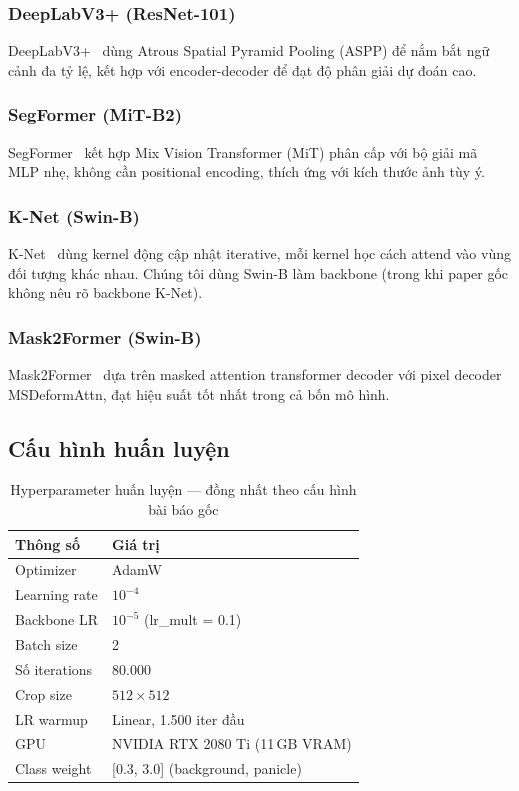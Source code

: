 \documentclass[12pt, a4paper]{article}
\begin{document}
\subsubsection{DeepLabV3+ (ResNet-101)}
DeepLabV3+~\cite{chen2018deeplabv3plus} dùng Atrous Spatial Pyramid Pooling (ASPP) để nắm bắt ngữ cảnh đa tỷ lệ, kết hợp với encoder-decoder để đạt độ phân giải dự đoán cao.

\subsubsection{SegFormer (MiT-B2)}
SegFormer~\cite{xie2021segformer} kết hợp Mix Vision Transformer (MiT) phân cấp với bộ giải mã MLP nhẹ, không cần positional encoding, thích ứng với kích thước ảnh tùy ý.

\subsubsection{K-Net (Swin-B)}
K-Net~\cite{zhang2021knet} dùng kernel động cập nhật iterative, mỗi kernel học cách attend vào vùng đối tượng khác nhau. Chúng tôi dùng Swin-B làm backbone (trong khi paper gốc không nêu rõ backbone K-Net).

\subsubsection{Mask2Former (Swin-B)}
Mask2Former~\cite{cheng2022mask2former} dựa trên masked attention transformer decoder với pixel decoder MSDeformAttn, đạt hiệu suất tốt nhất trong cả bốn mô hình.

\subsection{Cấu hình huấn luyện}

\begin{table}[H]
\centering
\caption{Hyperparameter huấn luyện --- đồng nhất theo cấu hình bài báo gốc}
\label{tab:training_config}
\begin{tabular}{@{}ll@{}}
\toprule
\textbf{Thông số} & \textbf{Giá trị} \\
\midrule
Optimizer         & AdamW \\
Learning rate     & $10^{-4}$ \\
Backbone LR       & $10^{-5}$ (lr\_mult = 0.1) \\
Batch size        & 2 \\
Số iterations     & 80.000 \\
Crop size         & $512 \times 512$ \\
LR warmup         & Linear, 1.500 iter đầu \\
GPU               & NVIDIA RTX 2080 Ti (11\,GB VRAM) \\
Class weight      & [0.3, 3.0] (background, panicle) \\
\bottomrule
\end{tabular}
\end{table}
\end{document}

